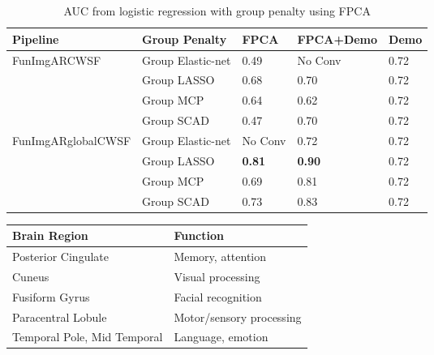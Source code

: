 \section*{}
    \centering 
\begin{table}[ht]
\centering
\caption{AUC from logistic regression with group penalty using FPCA}
\label{tab:classification_group}
\begin{tabular}{|l|l|l|l|l|}
\hline
\textbf{Pipeline} & \textbf{Group Penalty} & \textbf{FPCA} & \textbf{FPCA+Demo} & \textbf{Demo} \\ \hline
\multirow{4}{*}{FunImgARCWSF} & Group Elastic-net & 0.49 & No Conv & 0.72 \\ \cline{2-5} 
 & Group LASSO & 0.68 & 0.70 & 0.72 \\ \cline{2-5} 
 & Group MCP & 0.64 & 0.62 & 0.72 \\ \cline{2-5} 
 & Group SCAD & 0.47 & 0.70 & 0.72 \\ \hline
\multirow{4}{*}{FunImgARglobalCWSF} & Group Elastic-net & No Conv& 0.72 & 0.72 \\ \cline{2-5} 
 & Group LASSO & \textbf{0.81} & \textbf{0.90} & 0.72 \\ \cline{2-5} 
 & Group MCP & 0.69 & 0.81 & 0.72 \\ \cline{2-5} 
 & Group SCAD & 0.73 & 0.83 & 0.72 \\ \hline
\end{tabular}
\end{table}


\begin{tabular}{|l|l|}
\hline
\textbf{Brain Region} & \textbf{Function} \\
\hline
Posterior Cingulate & Memory, attention \\
\hline
Cuneus & Visual processing \\
\hline
Fusiform Gyrus & Facial recognition \\
\hline
Paracentral Lobule & Motor/sensory processing \\
\hline
Temporal Pole, Mid Temporal & Language, emotion \\
\hline
\end{tabular}
    